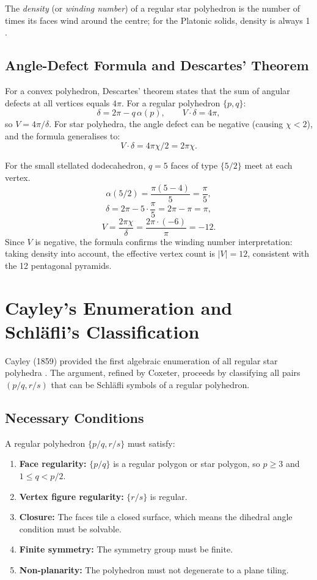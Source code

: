 The \emph{density} (or \emph{winding number}) of a regular star
polyhedron is the number of times its faces wind around the
centre; for the Platonic solids, density is always 1
\cite{coxeter_regular_polytopes}.

\subsection{Angle-Defect Formula and Descartes' Theorem}
\label{ssec:angle-defect}

For a convex polyhedron, Descartes' theorem states that the sum
of angular defects at all vertices equals $4\pi$.  For a
regular polyhedron \(\{p,q\}\):
\[
  \delta = 2\pi - q\,\alpha(p),
  \qquad
  V\cdot\delta = 4\pi,
\]
so $V = 4\pi / \delta$.  For star polyhedra, the angle
defect can be negative (causing \(\chi < 2\)), and the formula
generalises to:
\[
  V\cdot\delta = 4\pi\chi/2 = 2\pi\chi.
\]

\begin{proposition}
For the small stellated dodecahedron, $q=5$ faces of type
$\{5/2\}$ meet at each vertex.
\[
  \alpha(5/2) = \frac{\pi(5-4)}{5} = \frac{\pi}{5},
\]
\[
  \delta = 2\pi - 5 \cdot \frac{\pi}{5} = 2\pi - \pi = \pi,
\]
\[
  V = \frac{2\pi\chi}{\delta} = \frac{2\pi\cdot(-6)}{\pi} = -12.
\]
Since $V$ is negative, the formula confirms the winding number
interpretation: taking density into account, the effective
vertex count is $|V| = 12$, consistent with the 12 pentagonal
pyramids.
\end{proposition}

\section{Cayley's Enumeration and Schl\"{a}fli's Classification}
\label{sec:cayley-enumeration}

Cayley (1859) provided the first algebraic enumeration of all
regular star polyhedra \cite{coxeter_regular_polytopes}.  The argument,
refined by Coxeter, proceeds by classifying all pairs
$(p/q, r/s)$ that can be Schläfli symbols of a regular
polyhedron.

\subsection{Necessary Conditions}
\label{ssec:necessary-conditions}

A regular polyhedron \(\{p/q, r/s\}\) must satisfy:
\begin{enumerate}
  \item \textbf{Face regularity:} $\{p/q\}$ is a regular polygon or star polygon, so $p \geq 3$ and $1 \leq q < p/2$.
  \item \textbf{Vertex figure regularity:} $\{r/s\}$ is regular.
  \item \textbf{Closure:} The faces tile a closed surface, which means the dihedral angle condition must be solvable.
  \item \textbf{Finite symmetry:} The symmetry group must be finite.
  \item \textbf{Non-planarity:} The polyhedron must not degenerate to a plane tiling.
\end{enumerate}

